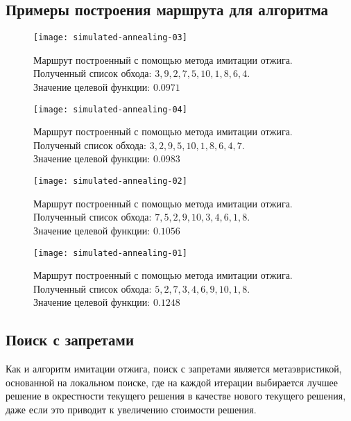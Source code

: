 \subsection{Примеры построения маршрута для алгоритма}
\begin{figure}[ht!]
    \centering
    \texttt{[image: simulated-annealing-03]}
    \caption{Маршрут построенный с помощью метода имитации отжига.\\
        Полученный список обхода: \( 3, 9, 2, 7, 5, 10, 1, 8, 6, 4 \).\\
        Значение целевой функции: \( 0.0971 \)}
    \label{fig:sim-ann-01}
    \texttt{[image: simulated-annealing-04]}
    \caption{Маршрут построенный с помощью метода имитации отжига.\\
        Полученый список обхода: \( 3, 2, 9, 5, 10, 1, 8, 6, 4, 7 \).\\
        Значение целевой функции: \( 0.0983 \)}
    \label{fig:sim-ann-02}
\end{figure}
\begin{figure}[ht!]
    \centering
    \texttt{[image: simulated-annealing-02]}
    \caption{Маршрут построенный с помощью метода имитации отжига.\\
        Полученный список обхода: \( 7, 5, 2, 9, 10, 3, 4, 6, 1, 8 \).\\
        Значение целевой функции: \( 0.1056 \)}
    \label{fig:sim-ann-03}
    \texttt{[image: simulated-annealing-01]}
    \caption{Маршрут построенный с помощью метода имитации отжига.\\
        Полученный список обхода: \( 5, 2, 7, 3, 4, 6, 9, 10, 1, 8 \).\\
        Значение целевой функции: \( 0.1248 \)}
    \label{fig:sim-ann-04}
\end{figure}

\clearpage

\subsection{Поиск с запретами}
Как и алгоритм имитации отжига, поиск с запретами является метаэвристикой, основанной на локальном поиске, 
где на каждой итерации выбирается лучшее решение в окрестности текущего решения в качестве нового текущего 
решения, даже если это приводит к увеличению стоимости решения.


